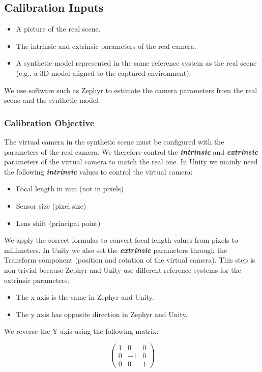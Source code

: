 \documentclass[11pt,a4paper]{article}
\theoremstyle{definition}
\theoremstyle{plain}
\theoremstyle{remark}
\begin{document}
\subsection{Calibration Inputs}
\begin{itemize}
    \item A picture of the real scene.
    \item The intrinsic and extrinsic parameters of the real camera.
    \item A synthetic model represented in the same reference system as the real scene (e.g., a 3D model aligned to the captured environment).
\end{itemize}

We use software such as Zephyr to estimate the camera parameters from the real scene and the synthetic model.

\subsubsection{Calibration Objective}
The virtual camera in the synthetic scene must be configured with the parameters of the real camera.
We therefore control the \textbf{\textit{intrinsic}} and \textbf{\textit{extrinsic}} parameters of the virtual camera to match the real one.
In Unity we mainly need the following \textbf{\textit{intrinsic}} values to control the virtual camera:
\begin{itemize}
    \item Focal length in mm (not in pixels)
    \item Sensor size (pixel size)
    \item Lens shift (principal point) 
\end{itemize}

We apply the correct formulas to convert focal length values from pixels to millimeters.
In Unity we also set the \textbf{\textit{extrinsic}} parameters through the Transform component (position and rotation of the virtual camera).
This step is non-trivial because Zephyr and Unity use different reference systems for the extrinsic parameters.
\begin{itemize}
    \item The x axis is the same in Zephyr and Unity.
    \item The y axis has opposite direction in Zephyr and Unity.
\end{itemize}

We reverse the Y axis using the following matrix:

\begin{equation}
    \begin{pmatrix}
        1 & 0 & 0 \\
        0 & -1 & 0 \\
        0 & 0 & 1
    \end{pmatrix}
\end{equation}
\end{document}

